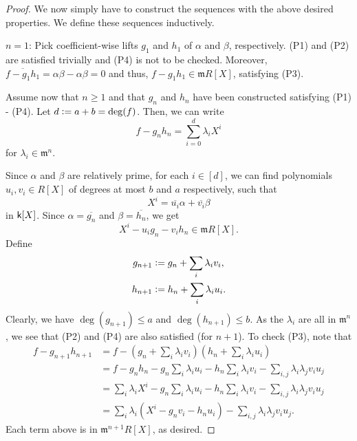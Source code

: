 \begin{proof}
	We now simply have to construct the sequences with the above desired properties. We define these sequences inductively.

	$n = 1$: Pick coefficient-wise lifts $g_{1}$ and $h_{1}$ of $\alpha$ and $\beta$, respectively. (P1) and (P2) are satisfied trivially and (P4) is not to be checked. Moreover, $\overline{f - g_{1} h_{1}} = \alpha\beta - \alpha\beta = 0$ and thus, $f - g_{1} h_{1} \in \mathfrak{m} R[X]$, satisfying (P3).

	Assume now that $n \ge 1$ and that $g_{n}$ and $h_{n}$ have been constructed satisfying (P1) - (P4). Let $d \vcentcolon= a + b = \deg(f)$. Then, we can write
	\begin{equation*} 
		f - g_{n} h_{n} = \sum_{i = 0}^{d} \lambda_{i} X^{i}
	\end{equation*}
	for $\lambda_{i} \in \mathfrak{m}^{n}$. 

	Since $\alpha$ and $\beta$ are relatively prime, for each $i \in [d]$, we can find polynomials $u_{i}, v_{i} \in R[X]$ of degrees at most $b$ and $a$ respectively, such that
	\begin{equation*} 
		X^{i} = \overline{u_{i}} \alpha + \overline{v_{i}} \beta
	\end{equation*}
	in $\mathsf{k}[X]$. Since $\alpha = \overline{g_{n}}$ and $\beta = \overline{h_{n}}$, we get
	\begin{equation*} 
		X^{i} - u_{i} g_{n} - v_{i} h_{n} \in \mathfrak{m} R[X].
	\end{equation*}
	Define
	\begin{align*} 
		g_{n + 1} &\vcentcolon= g_{n} + \sum_{i} \lambda_{i} v_{i}, \\
		h_{n + 1} &\vcentcolon= h_{n} + \sum_{i} \lambda_{i} u_{i}.
	\end{align*}
	Clearly, we have $\deg(g_{n + 1}) \le a$ and $\deg(h_{n + 1}) \le b$. As the $\lambda_{i}$ are all in $\mathfrak{m}^{n}$, we see that (P2) and (P4) are also satisfied (for $n + 1$). To check (P3), note that
	\begin{align*} 
		f - g_{n + 1} h_{n + 1} &= f - (g_{n} + \sum_{i} \lambda_{i} v_{i})(h_{n} + \sum_{i} \lambda_{i} u_{i}) \\
		&= f - g_{n} h_{n} - g_{n} \sum_{i} \lambda_{i} u_{i} - h_{n} \sum_{i} \lambda_{i} v_{i} - \sum_{i, j} \lambda_{i} \lambda_{j} v_{i} u_{j} \\
		&= \sum_{i} \lambda_{i} X^{i} - g_{n} \sum_{i} \lambda_{i} u_{i} - h_{n} \sum_{i} \lambda_{i} v_{i} - \sum_{i, j} \lambda_{i} \lambda_{j} v_{i} u_{j} \\
		&= \sum_{i} \lambda_{i} (X^{i} - g_{n} v_{i} - h_{n} u_{i}) - \sum_{i, j} \lambda_{i} \lambda_{j} v_{i} u_{j}.
	\end{align*}
	Each term above is in $\mathfrak{m}^{n + 1} R[X]$, as desired.
\end{proof}

